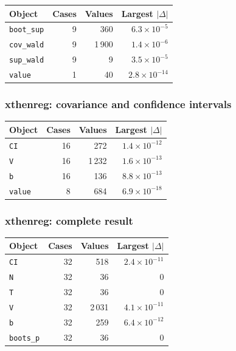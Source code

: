 \begin{longtable}{@{}p{8.2cm}rrr@{}}
\toprule
Object & Cases & Values & Largest $|\Delta|$ \\
\midrule
\endhead
\texttt{boot\_\allowbreak{}sup} & 9 & 360 & $6.3\times10^{-5}$ \\
\texttt{cov\_\allowbreak{}wald} & 9 & 1\,900 & $1.4\times10^{-6}$ \\
\texttt{sup\_\allowbreak{}wald} & 9 & 9 & $3.5\times10^{-5}$ \\
\texttt{value} & 1 & 40 & $2.8\times10^{-14}$ \\
\bottomrule
\end{longtable}

\subsubsection*{xthenreg: covariance and confidence intervals}

\begin{longtable}{@{}p{8.2cm}rrr@{}}
\toprule
Object & Cases & Values & Largest $|\Delta|$ \\
\midrule
\endhead
\texttt{CI} & 16 & 272 & $1.4\times10^{-12}$ \\
\texttt{V} & 16 & 1\,232 & $1.6\times10^{-13}$ \\
\texttt{b} & 16 & 136 & $8.8\times10^{-13}$ \\
\texttt{value} & 8 & 684 & $6.9\times10^{-18}$ \\
\bottomrule
\end{longtable}

\subsubsection*{xthenreg: complete result}

\begin{longtable}{@{}p{8.2cm}rrr@{}}
\toprule
Object & Cases & Values & Largest $|\Delta|$ \\
\midrule
\endhead
\texttt{CI} & 32 & 518 & $2.4\times10^{-11}$ \\
\texttt{N} & 32 & 36 & 0 \\
\texttt{T} & 32 & 36 & 0 \\
\texttt{V} & 32 & 2\,031 & $4.1\times10^{-11}$ \\
\texttt{b} & 32 & 259 & $6.4\times10^{-12}$ \\
\texttt{boots\_\allowbreak{}p} & 32 & 36 & 0 \\
\bottomrule
\end{longtable}

